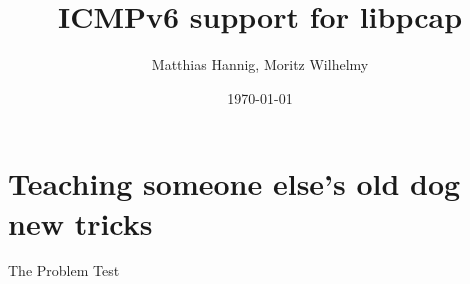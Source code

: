 \documentclass{beamer}
\title{ICMPv6 support for libpcap}
\date{\today}
\author{Matthias Hannig, Moritz Wilhelmy}
\institute{RIPE NCC IPv6 Hackathon Copenhagen}
\begin{document}
  \maketitle
  \section{Teaching someone else's old dog new tricks}
  \begin{frame}{The Problem}
    Test
  \end{frame}
\end{document}
